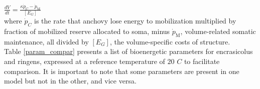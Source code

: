 $\frac{dV}{dt} = \frac{\kappa \dot{p}_{C} - \dot{p}_\mathrm{M}}{\left[E_{G} \right]}$\\

where $\dot{p}_{C}$ is the rate that anchovy lose energy to mobilization multiplied by fraction of mobilized reserve allocated to soma, minus $\dot{p}_\mathrm{M}$, volume-related somatic maintenance, all divided by $\left[E_{G} \right]$, the volume-specific costs of structure.\\

Table \ref{param_compar} presents a list of bioenergetic parameters for \gls{encrasicolus} and \gls{ringens}, expressed at a reference temperature of $20$ \textdegree $C$ to facilitate comparison. It is important to note that some parameters are present in one model but not in the other, and vice versa.\\

